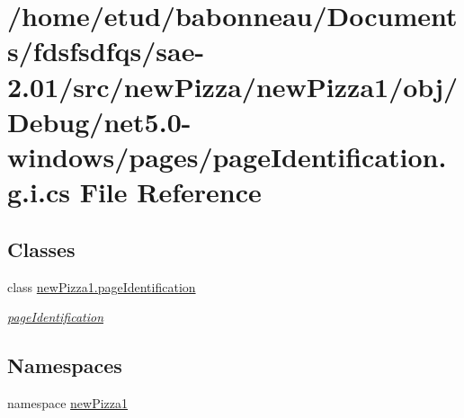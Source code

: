 \hypertarget{net5_80-windows_2pages_2pageIdentification_8g_8i_8cs}{}\section{/home/etud/babonneau/\+Documents/fdsfsdfqs/sae-\/2.01/src/new\+Pizza/new\+Pizza1/obj/\+Debug/net5.0-\/windows/pages/page\+Identification.g.\+i.\+cs File Reference}
\label{net5_80-windows_2pages_2pageIdentification_8g_8i_8cs}
\subsection*{Classes}
\begin{DoxyCompactItemize}
\item 
class \hyperlink{classnewPizza1_1_1pageIdentification}{new\+Pizza1.\+page\+Identification}
\begin{DoxyCompactList}\small\item\em \hyperlink{classnewPizza1_1_1pageIdentification}{page\+Identification} \end{DoxyCompactList}\end{DoxyCompactItemize}
\subsection*{Namespaces}
\begin{DoxyCompactItemize}
\item 
namespace \hyperlink{namespacenewPizza1}{new\+Pizza1}
\end{DoxyCompactItemize}
